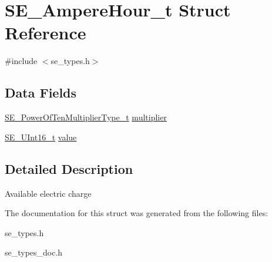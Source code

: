 \hypertarget{structSE__AmpereHour__t}{}\section{S\+E\+\_\+\+Ampere\+Hour\+\_\+t Struct Reference}
\label{structSE__AmpereHour__t}


{\ttfamily \#include $<$se\+\_\+types.\+h$>$}

\subsection*{Data Fields}
\begin{DoxyCompactItemize}
\item 
\hyperlink{group__PowerOfTenMultiplierType_gaf0317b781dc8dbb9cb6ac4e44a14fdef}{S\+E\+\_\+\+Power\+Of\+Ten\+Multiplier\+Type\+\_\+t} \hyperlink{group__AmpereHour_gab701095c4caf275675fc1cc3943a6dad}{multiplier}
\item 
\hyperlink{group__UInt16_gac68d541f189538bfd30cfaa712d20d29}{S\+E\+\_\+\+U\+Int16\+\_\+t} \hyperlink{group__AmpereHour_gabdf24e7f494b6811f2c47bf098afd789}{value}
\end{DoxyCompactItemize}


\subsection{Detailed Description}
Available electric charge 

The documentation for this struct was generated from the following files\+:\begin{DoxyCompactItemize}
\item 
se\+\_\+types.\+h\item 
se\+\_\+types\+\_\+doc.\+h\end{DoxyCompactItemize}
